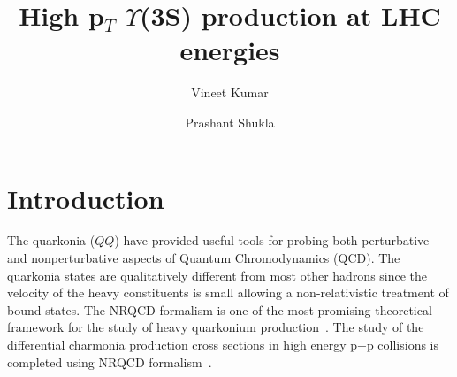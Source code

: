 \documentclass[twocolumn,amsmath,amssymb]{snp}
\begin{document}
\title{\Large High p$_{T}$ $\Upsilon$(3S) production at LHC energies} 
\author{\large Vineet Kumar}
\author{\large Prashant Shukla}
\maketitle
\section*{Introduction}
The quarkonia ($Q\bar Q$) have provided useful tools for probing both 
perturbative and nonperturbative aspects of Quantum Chromodynamics (QCD). 
The quarkonia states are qualitatively different from most other hadrons since 
the velocity of the heavy constituents is small allowing a 
non-relativistic treatment of bound states. The NRQCD formalism is one 
of the most promising theoretical framework for the study of heavy quarkonium 
production~\cite{Bodwin:1994jh}. The study of the differential charmonia production 
cross sections in high energy p+p collisions is completed using 
NRQCD formalism~\cite{Kumar:2016ojy}.
\end{document}
